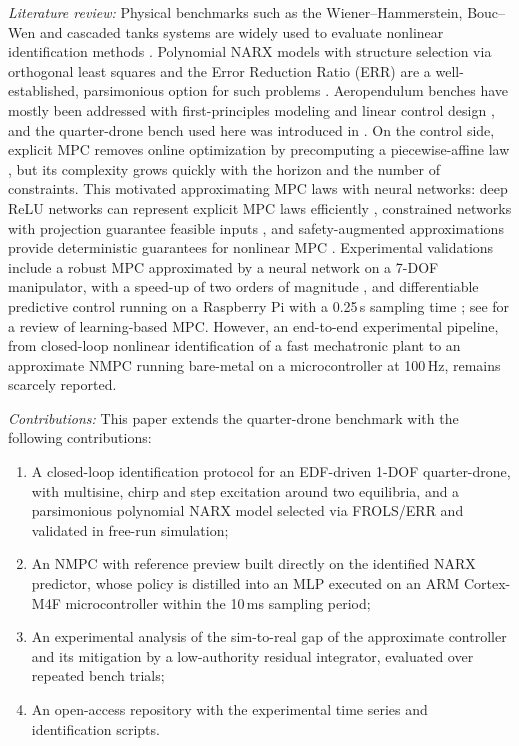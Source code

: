 \documentclass{ifacconf}
\newif\ifinstr \instrfalse
\newcommand{\instr}[1]{%
  \ifinstr
    \par\noindent
    \fcolorbox{orange!80!black}{yellow!20}{%
      \parbox{\dimexpr\linewidth-2\fboxsep-2\fboxrule}{%
        \small\sffamily\color{orange!40!black}%
        \textbf{Instrução:} #1}}%
    \par\medskip
  \fi}
\begin{document}
\textit{Literature review:} Physical benchmarks such as the Wiener--Hammerstein, Bouc--Wen and cascaded tanks systems are widely used to evaluate nonlinear identification methods \citep{schoukens2017}. Polynomial NARX models with structure selection via orthogonal least squares and the Error Reduction Ratio (ERR) are a well-established, parsimonious option for such problems \citep{chen1989,billings2013,aguirre2015}. Aeropendulum benches have mostly been addressed with first-principles modeling and linear control design \citep{job2015}, and the quarter-drone bench used here was introduced in \citet{lima2025}. On the control side, explicit MPC removes online optimization by precomputing a piecewise-affine law \citep{bemporad2002}, but its complexity grows quickly with the horizon and the number of constraints. This motivated approximating MPC laws with neural networks: deep ReLU networks can represent explicit MPC laws efficiently \citep{karg2020}, constrained networks with projection guarantee feasible inputs \citep{chen2018approximating}, and safety-augmented approximations provide deterministic guarantees for nonlinear MPC \citep{hose2025approximate}. Experimental validations include a robust MPC approximated by a neural network on a 7-DOF manipulator, with a speed-up of two orders of magnitude \citep{nubert2020safe}, and differentiable predictive control running on a Raspberry Pi with a 0.25\,s sampling time \citep{drgona2022differentiable}; see \citet{hewing2020learning} for a review of learning-based MPC. However, an end-to-end experimental pipeline, from closed-loop nonlinear identification of a fast mechatronic plant to an approximate NMPC running bare-metal on a microcontroller at 100\,Hz, remains scarcely reported.

\instr{Revisão da literatura: estudos de caso em identificacao de sistemas.}

\textit{Contributions:} This paper extends the quarter-drone benchmark \citep{lima2025} with the following contributions:
\begin{enumerate}
    \item A closed-loop identification protocol for an EDF-driven 1-DOF quarter-drone, with multisine, chirp and step excitation around two equilibria, and a parsimonious polynomial NARX model selected via FROLS/ERR and validated in free-run simulation;
    \item An NMPC with reference preview built directly on the identified NARX predictor, whose policy is distilled into an MLP executed on an ARM Cortex-M4F microcontroller within the 10\,ms sampling period;
    \item An experimental analysis of the sim-to-real gap of the approximate controller and its mitigation by a low-authority residual integrator, evaluated over repeated bench trials;
    \item An open-access repository with the experimental time series and identification scripts.
\end{enumerate}
\end{document}
